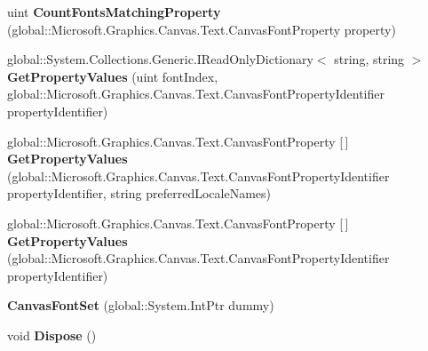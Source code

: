 \begin{DoxyCompactItemize}
uint {\bfseries Count\+Fonts\+Matching\+Property} (global\+::\+Microsoft.\+Graphics.\+Canvas.\+Text.\+Canvas\+Font\+Property property)
\item 
\mbox{\label{class_microsoft_1_1_graphics_1_1_canvas_1_1_text_1_1_canvas_font_set_a814e7ae485933c4e7fbf68602ad588b9}} 
global\+::\+System.\+Collections.\+Generic.\+I\+Read\+Only\+Dictionary$<$ string, string $>$ {\bfseries Get\+Property\+Values} (uint font\+Index, global\+::\+Microsoft.\+Graphics.\+Canvas.\+Text.\+Canvas\+Font\+Property\+Identifier property\+Identifier)
\item 
\mbox{\label{class_microsoft_1_1_graphics_1_1_canvas_1_1_text_1_1_canvas_font_set_aa821ceb086ad0eb5aed484241b6bea7a}} 
global\+::\+Microsoft.\+Graphics.\+Canvas.\+Text.\+Canvas\+Font\+Property \mbox{[}$\,$\mbox{]} {\bfseries Get\+Property\+Values} (global\+::\+Microsoft.\+Graphics.\+Canvas.\+Text.\+Canvas\+Font\+Property\+Identifier property\+Identifier, string preferred\+Locale\+Names)
\item 
\mbox{\label{class_microsoft_1_1_graphics_1_1_canvas_1_1_text_1_1_canvas_font_set_ad5ad519ae1f152fedadf48d0d911f919}} 
global\+::\+Microsoft.\+Graphics.\+Canvas.\+Text.\+Canvas\+Font\+Property \mbox{[}$\,$\mbox{]} {\bfseries Get\+Property\+Values} (global\+::\+Microsoft.\+Graphics.\+Canvas.\+Text.\+Canvas\+Font\+Property\+Identifier property\+Identifier)
\item 
\mbox{\label{class_microsoft_1_1_graphics_1_1_canvas_1_1_text_1_1_canvas_font_set_aed5c881dc2a997f7281bf32d019b0d26}} 
{\bfseries Canvas\+Font\+Set} (global\+::\+System.\+Int\+Ptr dummy)
\item 
\mbox{\label{class_microsoft_1_1_graphics_1_1_canvas_1_1_text_1_1_canvas_font_set_a8f2287005fb2f87cc3459710f9266acc}} 
void {\bfseries Dispose} ()
\item 
\mbox{\label{class_microsoft_1_1_graphics_1_1_canvas_1_1_text_1_1_canvas_font_set_a1113ba1353deb4c7fe0e1a7dc51973da}} 

\end{DoxyCompactItemize}
